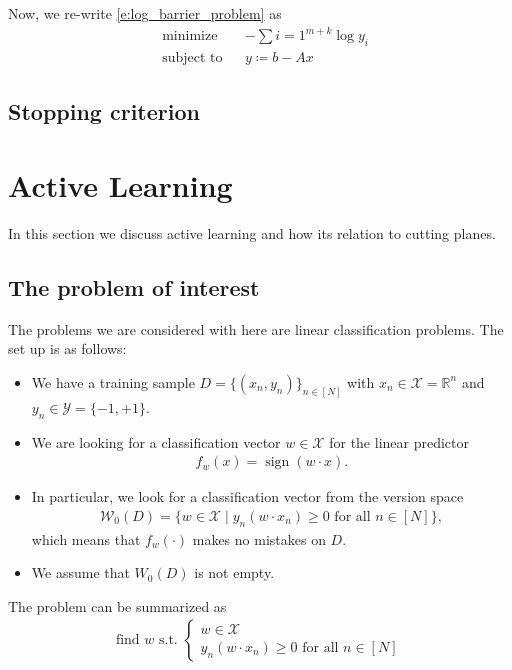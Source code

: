 \documentclass[11pt]{amsart}
\theoremstyle{definition}
\theoremstyle{remark}
\DeclareMathOperator{\sign}{sign}
\begin{document}
        Now, we re-write \eqref{e:log_barrier_problem} as
        \begin{equation*}
            \begin{aligned}
            & {\text{minimize}} && -\sum{i=1}^{m+k} \log{y_i} \\
            & \text{subject to} && y \coloneqq b - Ax
            \end{aligned}
        \end{equation*}

    \subsection{Stopping criterion}

\section*{Active Learning}
    In this section we discuss active learning and how its relation to cutting planes.
    \subsection*{The problem of interest}
        The problems we are considered with here are linear classification problems. The set up is as follows:
        \begin{itemize}
            \item We have a training sample $D = \{(x_n, y_n)\}_{n \in [N]}$ with $x_n \in \mathcal{X} = \mathbb{R}^n$ and $y_n \in \mathcal{Y} = \{-1, +1\}$.
            \item We are looking for a classification vector $w \in \mathcal{X}$ for the linear predictor 
            \begin{align*}
                f_w(x) = \sign(w \cdot x).
            \end{align*}
            \item In particular, we look for a classification vector from the version space
            \begin{align*}
                \mathcal{W}_0(D) = \{w \in \mathcal{X} \;|\; y_n(w \cdot x_n) \geq 0 \text{ for all } n \in [N] \},
            \end{align*}
            which means that $f_w(\cdot)$ makes no mistakes on $D$.
            \item We assume that $W_0(D)$ is not empty.
        \end{itemize}
        The problem can be summarized as 
        \begin{align*}
            \text{find } w \text{ s.t. } 
            \begin{cases} 
                w \in \mathcal{X} \\
                y_n(w \cdot x_n) \geq 0 \text{ for all } n \in [N]
            \end{cases}
        \end{align*}
\end{document}
